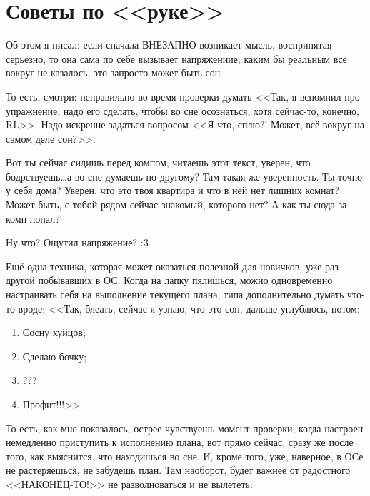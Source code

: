 \documentclass[a4paper,14pt,oneside]{memoir}
\begin{document}
\chapter{Советы по <<руке>>}


\medskip

Об этом я писал: если сначала ВНЕЗАПНО возникает мысль, воспринятая серьёзно, то она сама по себе вызывает напряжениие; каким бы реальным всё вокруг не казалось, это запросто может быть сон.

То есть, смотри: неправильно во время проверки думать <<Так, я вспомнил про упражнение, надо его сделать, чтобы во сне осознаться, хотя сейчас-то, конечно, RL>>. Надо искренне задаться вопросом <<Я что, сплю?! Может, всё вокруг на самом деле сон?>>.

Вот ты сейчас сидишь перед компом, читаешь этот текст, уверен, что бодрствуешь\ldots а во сне думаешь по-другому? Там такая же уверенность. 
Ты точно у себя дома? Уверен, что это твоя квартира и что в ней нет лишних комнат? Может быть, с тобой рядом сейчас знакомый, которого нет? А как ты сюда за комп попал? 

Ну что? Ощутил напряжение? :3

Ещё одна техника, которая может оказаться полезной для новичков, уже раз-другой побывавших в ОС. Когда на лапку пялишься, можно одновременно настраивать себя на выполнение текущего плана, типа дополнительно думать что-то вроде: <<Так, блеать, сейчас я узнаю, что это сон, дальше углублюсь, потом:
\begin{enumerate}
\item Сосну хуйцов;
\item Сделаю бочку;
\item ???
\item Профит!!!>>
\end{enumerate}

То есть, как мне показалось, острее чувствуешь момент проверки, когда настроен немедленно приступить к исполнению плана, вот прямо сейчас, сразу же после того, как выяснится, что находишься во сне. И, кроме того, уже, наверное, в ОСе не растеряешься, не забудешь план. Там наоборот, будет важнее от радостного <<НАКОНЕЦ-ТО!>> не разволноваться и не вылететь.
\end{document}
